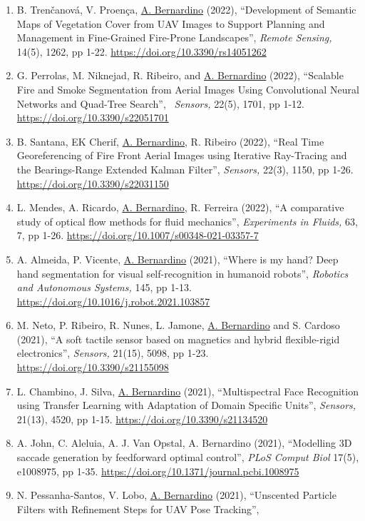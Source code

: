 \begin{enumerate}
\item
  B. Trenčanová, V. Proença, \ul{A. Bernardino} (2022), ``Development of
  Semantic Maps of Vegetation Cover from UAV Images to Support Planning
  and Management in Fine-Grained Fire-Prone Landscapes'', \emph{Remote
  Sensing,} 14(5), 1262, pp 1-22.
  \url{https://doi.org/10.3390/rs14051262}
\item
  G. Perrolas, M. Niknejad, R. Ribeiro, and \ul{A. Bernardino} (2022),
  ``Scalable Fire and Smoke Segmentation from Aerial Images Using
  Convolutional Neural Networks and Quad-Tree Search'',~ \emph{Sensors,}
  22(5), 1701, pp 1-12. \url{https://doi.org/10.3390/s22051701}
\item
  B. Santana, EK Cherif, \ul{A. Bernardino}, R. Ribeiro (2022), ``Real
  Time Georeferencing of Fire Front Aerial Images using Iterative
  Ray-Tracing and the Bearings-Range Extended Kalman Filter'',
  \emph{Sensors,} 22(3), 1150, pp 1-26.
  \url{https://doi.org/10.3390/s22031150}~
\item
  L. Mendes, A. Ricardo, \ul{A. Bernardino}, R. Ferreira (2022), ``A
  comparative study of optical flow methods for fluid mechanics'',
  \emph{Experiments in Fluids,} 63, 7, pp 1-26.
  \url{https://doi.org/10.1007/s00348-021-03357-7}~
\item
  A. Almeida, P. Vicente, \ul{A. Bernardino} (2021), ``Where is my hand?
  Deep hand segmentation for visual self-recognition in humanoid
  robots'', \emph{Robotics and Autonomous Systems,} 145, pp 1-13.
  \url{https://doi.org/10.1016/j.robot.2021.103857}~~
\item
  M. Neto, P. Ribeiro, R. Nunes, L. Jamone, \ul{A. Bernardino} and S.
  Cardoso (2021), ``A soft tactile sensor based on magnetics and hybrid
  flexible-rigid electronics'', \emph{Sensors,} 21(15), 5098, pp 1-23.
  \url{https://doi.org/10.3390/s21155098}~~
\item
  L. Chambino, J. Silva, \ul{A. Bernardino} (2021), ``Multispectral Face
  Recognition using Transfer Learning with Adaptation of Domain Specific
  Units'', \emph{Sensors,} 21(13), 4520, pp 1-15.
  \url{https://doi.org/10.3390/s21134520}~
\item
  A. John, C. Aleluia, A. J. Van Opstal, A. Bernardino (2021),
  ``Modelling 3D saccade generation by feedforward optimal control'',
  \emph{PLoS Comput Biol} 17(5), e1008975, pp 1-35.
  \url{https://doi.org/10.1371/journal.pcbi.1008975}~
\item
  N. Pessanha-Santos, V. Lobo, \ul{A. Bernardino} (2021), ``Unscented
  Particle Filters with Refinement Steps for UAV Pose Tracking'',

\end{enumerate}
